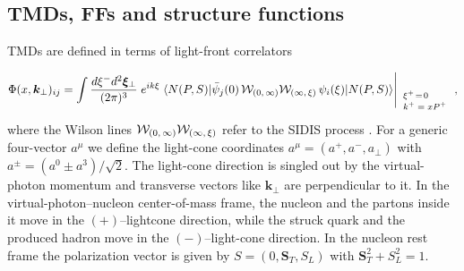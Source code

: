 \documentclass[a4paper,11pt]{article}
\newcommand{\be}{\begin{equation}}
\newcommand{\ee}{\end{equation}}
\newcommand{\la}{\langle}
\newcommand{\ra}{\rangle}
\newcommand{\with}[3]{{\Biggl|{\renewcommand*{\arraystretch}{0.8}
	\begin{array}{l}
	\phantom{X}\\
	\mbox{\scriptsize ${#1}$}\\
	\mbox{\scriptsize ${#2}$}\\
	\mbox{\scriptsize #3}\end{array}}}}
\def\bfkperp{{\bm k}_\perp}
\begin{document}
\subsection{TMDs, FFs and structure functions}
\label{Sec-2.2:def-TMD-FF}

TMDs are defined in terms of light-front correlators
\be\label{Eq:correlator}
    	\Phi(x,\bfkperp)_{ij} = \int\frac{ d \xi^- d^2{\bm \xi}_\perp}{(2\pi)^3}
	\;e^{ik\xi}\;\la N(P,S)|\bar\psi_j(0)\,{\cal W}_{(0,\,\infty)}
	{\cal W}_{(\infty,\,\xi)}\,\psi_i(\xi)|N(P,S)\ra
    	\with{ }{\xi^+\!=\!0}{$k^+ = xP^+$}  \, ,
	\ee
where the Wilson lines  {${\cal W}_{(0,\,\infty)}{\cal W}_{(\infty,\,\xi)}$}
refer to the SIDIS process
\cite{Collins:2002kn}. For a generic four-vector $a^\mu$ we define
the light-cone coordinates $a^\mu=(a^+,a^-,a_\perp)$ with
$a^\pm=(a^0\pm a^3)/\sqrt{2}$.
The light-cone direction is singled out by the virtual-photon momentum
and transverse vectors like $\bfkperp$ are perpendicular to it. In the
virtual-photon--nucleon center-of-mass frame, the nucleon and the partons
inside it move in the $(+)$--lightcone direction, while the struck
quark and the produced hadron move in the $(-)$--light-cone direction.
In the nucleon rest frame the polarization vector is given by
$S=(0,{\bm S}_T,S_L)$ with ${\bm S}_T^2+S_L^2=1$.
\end{document}
